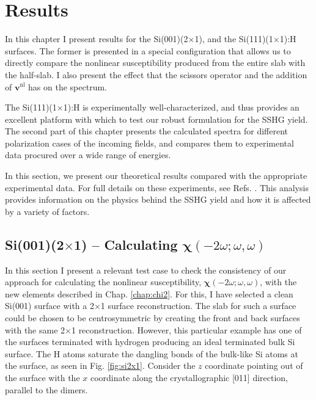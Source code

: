 \documentclass[11pt]{book}
\begin{document}
\chapter{Results}\label{chap:results}

In this chapter I present results for the Si(001)(2$\times$1), and the
Si(111)(1$\times$1):H surfaces. The former is presented in a special
configuration that allows us to directly compare the nonlinear susceptibility
produced from the entire slab with the half-slab. I also present the effect that
the scissors operator and the addition of $\mathbf{v}^{\mathrm{nl}}$ has on the
spectrum.

The Si(111)(1$\times$1):H is experimentally well-characterized, and thus
provides an excellent platform with which to test our robust formulation for the
SSHG yield. The second part of this chapter presents the calculated spectra for
different polarization cases of the incoming fields, and compares them to
experimental data procured over a wide range of energies.

In this section, we present our theoretical results compared with the appropriate experimental data. For full details on these experiments, see Refs. \cite{hoferAPA96, mitchellSS01, mejiaPRB02, bergfeldPRL04}. This analysis provides information on the physics behind the SSHG yield and how it is affected by a variety of factors.



\section{ 
\texorpdfstring{Si(001)(2$\times$1)}{Si(001)(2x1)} --
Calculating
\texorpdfstring{$\boldsymbol{\chi}(-2\omega;\omega,\omega)$}{X(-2w;w,w)}
}

In this section I present a relevant test case to check the consistency of our
approach for calculating the nonlinear susceptibility,
$\boldsymbol{\chi}(-2\omega;\omega,\omega)$, with the new elements described in
Chap. \ref{chap:chi2}. For this, I have selected a clean Si(001) surface with a
2$\times$1 surface reconstruction. The slab for such a surface could be chosen
to be centrosymmetric by creating the front and back surfaces with the same
2$\times$1 reconstruction. However, this particular example has one of the
surfaces terminated with hydrogen producing an ideal terminated bulk Si surface.
The H atoms saturate the dangling bonds of the bulk-like Si atoms at the
surface, as seen in Fig. \ref{fig:si2x1}. Consider the $z$ coordinate pointing
out of the surface with the $x$ coordinate along the crystallographic [011]
direction, parallel to the dimers.
\end{document}
